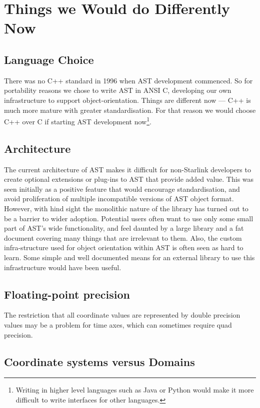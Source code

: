 \documentclass[final,authoryear,5p,times,twocolumn]{elsarticle}
\begin{document}
\section{Things we Would do Differently Now}

\subsection{Language Choice}

There was no C++ standard in 1996 when AST development commenced.
So for portability reasons we chose to write AST in ANSI C, developing
our own infrastructure to support object-orientation. Things are
different now --- C++ is much more mature with greater standardisation.
For that reason we would choose C++ over C if starting AST development
now\footnote{Writing in higher level languages such as Java or Python would make
it more difficult to write interfaces for other languages.}.

\subsection{Architecture}

The current architecture of AST makes it difficult for non-Starlink
developers to create optional extensions or plug-ins to AST that provide added
value. This was seen initially as a positive feature that would
encourage standardisation, and avoid proliferation of multiple incompatible
versions of AST object format. However, with hind sight the monolithic
nature of the library has turned out to be a barrier to wider adoption.
Potential users often want to use only some small part of AST's wide
functionality, and feel daunted by a large library and a fat document
covering many things that are irrelevant to them. Also, the custom infra-structure
used for object orientation within AST is often seen as hard to learn.
Some simple and well documented means for an external library to use this
infrastructure would have been useful.

\subsection{Floating-point precision}

The restriction that all coordinate values are represented by
double precision values may be a problem for time axes, which can
sometimes require quad precision.

\subsection{Coordinate systems versus Domains}
\end{document}
